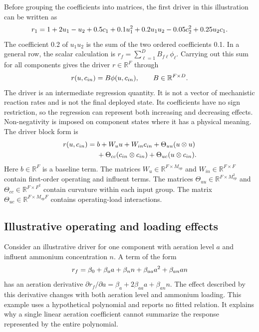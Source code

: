 Before grouping the coefficients into matrices, the first driver in this illustration can be written as
\begin{equation}
\equationname{Scalar polynomial form of the illustrative regression driver}
\label{eq:icsor_scalar_driver_example}
r_1=1+2u_1-u_2+0.5c_1+0.1u_1^2
+0.2u_1u_2-0.05c_2^2+0.25u_2c_1.
\end{equation}
The coefficient 0.2 of \(u_1u_2\) is the sum of the two ordered coefficients 0.1. In a general row, the scalar calculation is \(r_f=\sum_{\ell=1}^{D}B_{f\ell}\phi_\ell\). Carrying out this sum for all components gives the driver \(r\in\mathbb{R}^{F}\) through
\begin{equation}
\equationname{Matrix mapping from second-order features to the regression driver}
\label{eq:icsor_driver}
r(u,c_{in})=B\phi(u,c_{in}),
\qquad B\in\mathbb{R}^{F\times D}.
\end{equation}
The driver is an intermediate regression quantity. It is not a vector of mechanistic reaction rates and is not the final deployed state. Its coefficients have no sign restriction, so the regression can represent both increasing and decreasing effects. Non-negativity is imposed on component states where it has a physical meaning. The driver block form is
\begin{equation}
\equationname{Driver decomposition into operating, influent, and interaction blocks}
\label{eq:icsor_driver_blocks}
\begin{aligned}
r(u,c_{in})={}&b+W_u u+W_{in}c_{in}
+\Theta_{uu}(u\otimes u)\\
&+\Theta_{cc}(c_{in}\otimes c_{in})
+\Theta_{uc}(u\otimes c_{in}).
\end{aligned}
\end{equation}
Here \(b\in\mathbb{R}^{F}\) is a baseline term. The matrices \(W_u\in\mathbb{R}^{F\times M_{op}}\) and \(W_{in}\in\mathbb{R}^{F\times F}\) contain first-order operating and influent terms. The matrices \(\Theta_{uu}\in\mathbb{R}^{F\times M_{op}^{2}}\) and \(\Theta_{cc}\in\mathbb{R}^{F\times F^{2}}\) contain curvature within each input group. The matrix \(\Theta_{uc}\in\mathbb{R}^{F\times M_{op}F}\) contains operating-load interactions.

\subsection{Illustrative operating and loading effects}

Consider an illustrative driver for one component with aeration level \(a\) and influent ammonium concentration \(n\). A term of the form
\begin{equation}
\equationname{Illustrative driver with aeration, nitrogen, and interaction effects}
\label{eq:icsor_example_driver}
r_f=\beta_0+\beta_a a+\beta_n n+\beta_{aa}a^2+\beta_{an}an
\end{equation}
has an aeration derivative \(\partial r_f/\partial a=\beta_a+2\beta_{aa}a+\beta_{an}n\). The effect described by this derivative changes with both aeration level and ammonium loading. This example uses a hypothetical polynomial and reports no fitted relation. It explains why a single linear aeration coefficient cannot summarize the response represented by the entire polynomial.


